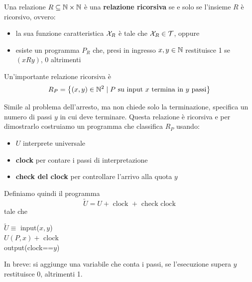 Una relazione $R \subseteq \mathbb{N} \times \mathbb{N}$ è una \textbf{relazione ricorsiva} se e solo se l'insieme $R$ è ricorsivo, ovvero:
\begin{itemize}
	\item la sua funzione caratteristica $\mathcal{X}_R$ è tale che $\mathcal{X}_R \in \mathcal{T}$, oppure
	\item esiste un programma $P_R$ che, presi in ingresso $x,y \in \mathbb{N}$ restituisce 1 se $(xRy)$, 0 altrimenti
\end{itemize}

Un'importante relazione ricorsiva è 
$$ R_P = \left\{(x,y) \in \mathbb{N}^2 \mid P \text{ su input } x \text{ termina in } y \text{ passi}\right\} $$

Simile al problema dell'arresto, ma non chiede solo la terminazione, specifica un numero di passi $y$ in cui deve terminare. Questa relazione è ricorsiva e per dimostrarlo costruiamo un programma che classifica $R_P$ usando:
\begin{itemize}
	\item $U$ interprete universale
	\item \textbf{clock} per contare i passi di interpretazione
	\item \textbf{check del clock} per controllare l'arrivo alla quota $y$
\end{itemize}

Definiamo quindi il programma
$$ \tilde U = U + \text{ clock } + \text{ check clock}$$
tale che
\begin{center}
	\begin{minipage}{.85\textwidth}
		\begin{tcolorbox}[colback=white,sharp corners,boxrule=.3mm]
			\begin{algorithm}[H]
				\SetAlgoNoEnd
				$\tilde U \equiv$ input($x,y$) \\
				$U(P,x) + $ clock \\
				output(clock==$y$) \\
			\end{algorithm}
		\end{tcolorbox} 
	\end{minipage}
\end{center}

In breve: si aggiunge una variabile che conta i passi, se l'esecuzione supera $y$ restituisce 0, altrimenti 1.\\

